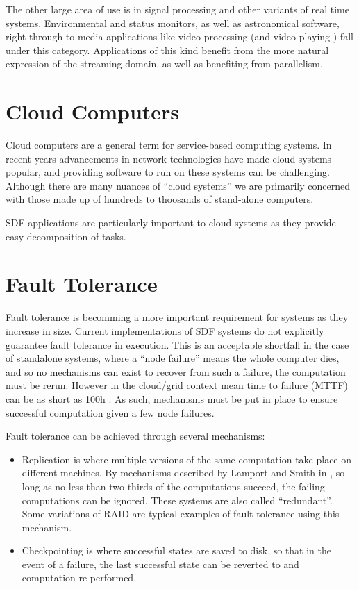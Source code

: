 The other large area of use is in signal processing and other variants of real time systems.
Environmental and status monitors, as well as astronomical software, right through to media applications like video processing (and video playing \cite{thies02}) fall under this category.
Applications of this kind benefit from the more natural expression of the streaming domain, as well as benefiting from parallelism.

\section{Cloud Computers}
Cloud computers are a general term for service-based computing systems.
In recent years advancements in network technologies have made cloud systems popular, and providing software to run on these systems can be challenging.
Although there are many nuances of ``cloud systems'' we are primarily concerned with those made up of hundreds to thoosands of stand-alone computers.

SDF applications are particularly important to cloud systems as they provide easy decomposition of tasks.

\section{Fault Tolerance}
Fault tolerance is becomming a more important requirement for systems as they increase in size.
Current implementations of SDF systems \cite{mal08, thies02, thies10} do not explicitly guarantee fault tolerance in execution.
This is an acceptable shortfall in the case of standalone systems, where a ``node failure'' means the whole computer dies, and so no mechanisms can exist to recover from such a failure, the computation must be rerun.
However in the cloud/grid context mean time to failure (MTTF) can be as short as 100h \cite{ree06}.
As such, mechanisms must be put in place to ensure successful computation given a few node failures.

Fault tolerance can be achieved through several mechanisms:
\begin{itemize}
	\item Replication is where multiple versions of the same computation take place on different machines.  By mechanisms described by Lamport and Smith in \cite{lam86}, so long as no less than two thirds of the computations succeed, the failing computations can be ignored.
			These systems are also called ``redundant''.  Some variations of RAID are typical examples of fault tolerance using this mechanism.
	\item Checkpointing is where successful states are saved to disk, so that in the event of a failure, the last successful state can be reverted to and computation re-performed.
\end{itemize}

